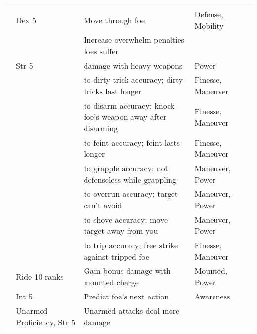 \begin{longtabuwrapper}
\begin{longtabu}{>{\lcol}p{10em} >{\lcol}p{15em} >{\lcol}X >{\lcol}p{8em} >{\lcol}p{3em}}
        \midrule
         &  &  &  &  \\
         & Dex 5 & Move through foe & Defense, Mobility &  \\
         & \x & Increase overwhelm penalties foes suffer & \x &  \\
         & Str 5 &  damage with heavy weapons & Power &  \\
         & \x &  to dirty trick accuracy; dirty tricks last longer & Finesse, Maneuver &  \\
         & \x &  to disarm accuracy; knock foe's weapon away after disarming & Finesse, Maneuver &  \\
         & \x &  to feint accuracy; feint lasts longer & Finesse, Maneuver &  \\
         & \x &  to grapple accuracy; not defenseless while grappling & Maneuver, Power &  \\
         & \x &  to overrun accuracy; target can't avoid & Maneuver, Power &  \\
         & \x &  to shove accuracy; move target away from you & Maneuver, Power &  \\
         & \x &  to trip accuracy; free strike against tripped foe & Finesse, Maneuver &  \\
         & Ride 10 ranks & Gain bonus damage with mounted charge & Mounted, Power &  \\
         & Int 5 & Predict foe's next action & Awareness &  \\
         & Unarmed Proficiency, Str 5 & Unarmed attacks deal more damage & \x &  \\


\end{longtabu}
\end{longtabuwrapper}
